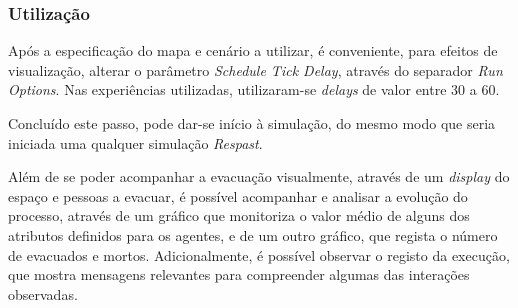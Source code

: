 \documentclass[12pt]{article}
\begin{document}
\begin{titlepage}
\subsubsection{Utilização}

Após a especificação do mapa e cenário a utilizar, é conveniente, para efeitos de visualização, alterar o parâmetro \textit{Schedule Tick Delay}, através do separador \textit{Run Options}. Nas experiências utilizadas, utilizaram-se \textit{delays} de valor entre 30 a 60.

Concluído este passo, pode dar-se início à simulação, do mesmo modo que seria iniciada uma qualquer simulação \textit{Respast}.

Além de se poder acompanhar a evacuação visualmente, através de um \textit{display} do espaço e pessoas a evacuar, é possível acompanhar e analisar a evolução do processo, através de um gráfico que monitoriza o valor médio de alguns dos atributos definidos para os agentes, e de um outro gráfico, que regista o número de evacuados e mortos. Adicionalmente, é possível observar o registo da execução, que mostra mensagens relevantes para compreender algumas das interações observadas.

\end{titlepage}
\end{document}
